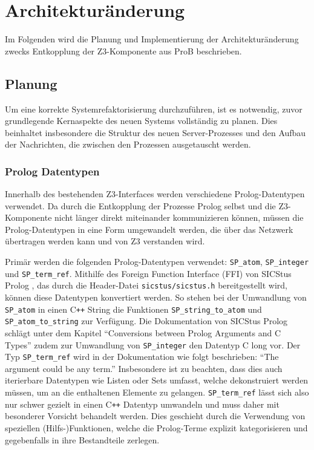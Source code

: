 \clearpage
\section{Architekturänderung}

Im Folgenden wird die Planung und Implementierung der Architekturänderung zwecks Entkopplung der Z3-Komponente aus ProB beschrieben.

\subsection{Planung}

Um eine korrekte Systemrefaktorisierung durchzuführen, ist es notwendig, zuvor grundlegende Kernaspekte
des neuen Systems vollständig zu planen. Dies beinhaltet insbesondere die Struktur des neuen Server-Prozesses
und den Aufbau der Nachrichten, die zwischen den Prozessen ausgetauscht werden.

\subsubsection{Prolog Datentypen}

Innerhalb des bestehenden Z3-Interfaces werden verschiedene Prolog-Datentypen verwendet.
Da durch die Entkopplung der Prozesse Prolog selbst und die Z3-Komponente nicht länger direkt miteinander kommunizieren können,
müssen die Prolog-Datentypen in eine Form umgewandelt werden, die über das Netzwerk übertragen werden kann und von Z3 verstanden wird.

Primär werden die folgenden Prolog-Datentypen verwendet: \texttt{SP\_atom}, \texttt{SP\_integer} und \texttt{SP\_term\_ref}.
Mithilfe des Foreign Function Interface (FFI) von SICStus Prolog \cite{carlsson1988sicstus}, das durch die Header-Datei \texttt{sicstus/sicstus.h} bereitgestellt wird, können diese Datentypen konvertiert werden.
So stehen bei der Umwandlung von \texttt{SP\_atom} in einen C\texttt{++} String die Funktionen \texttt{SP\_string\_to\_atom} und \texttt{SP\_atom\_to\_string} zur Verfügung.
Die Dokumentation von SICStus Prolog schlägt unter dem Kapitel \enquote{Conversions between Prolog Arguments and C Types} zudem zur Umwandlung von \texttt{SP\_integer} den Datentyp C long vor.
Der Typ \texttt{SP\_term\_ref} wird in der Dokumentation wie folgt beschrieben: \enquote{The argument could be any term.}
Insbesondere ist zu beachten, dass dies auch iterierbare Datentypen wie Listen oder Sets umfasst, welche dekonstruiert werden müssen, um an die enthaltenen Elemente zu gelangen.
\texttt{SP\_term\_ref} lässt sich also nur schwer gezielt in einen C\texttt{++} Datentyp umwandeln und muss daher mit besonderer Vorsicht behandelt werden.
Dies geschieht durch die Verwendung von speziellen (Hilfs-)Funktionen, welche die Prolog-Terme explizit kategorisieren und gegebenfalls in ihre Bestandteile zerlegen.

